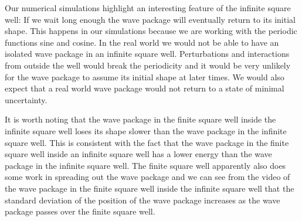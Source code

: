 \documentclass[12pt,a4paper]{article}
\begin{document}
Our numerical simulations highlight an interesting feature of the infinite square well: If we wait long enough the wave package will eventually return to its initial shape. This happens in our simulations because we are working with the periodic functions sine and cosine. In the real world we would not be able to have an isolated wave package in an infinite square well. Perturbations and interactions from outside the well would break the periodicity and it would be very unlikely for the wave package to assume its initial shape at later times. We would also expect that a real world wave package would not return to a state of minimal uncertainty.

It is worth noting that the wave package in the finite square well inside the infinite square well loses its shape slower than the wave package in the infinite square well. This is consistent with the fact that the wave package in the finite square well inside an infinite square well has a lower energy than the wave package in the infinite square well. The finite square well apparently also does some work in spreading out the wave package and we can see from the video of the wave package in the finite square well inside the infinite square well that the standard deviation of the position of the wave package increases as the wave package passes over the finite square well.
\end{document}
